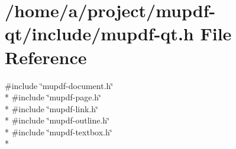 \hypertarget{mupdf-qt_8h}{\section{/home/a/project/mupdf-\/qt/include/mupdf-\/qt.h File Reference}
\label{mupdf-qt_8h}
}
{\ttfamily \#include \char`\"{}mupdf-\/document.\-h\char`\"{}}\\*
{\ttfamily \#include \char`\"{}mupdf-\/page.\-h\char`\"{}}\\*
{\ttfamily \#include \char`\"{}mupdf-\/link.\-h\char`\"{}}\\*
{\ttfamily \#include \char`\"{}mupdf-\/outline.\-h\char`\"{}}\\*
{\ttfamily \#include \char`\"{}mupdf-\/textbox.\-h\char`\"{}}\\*
